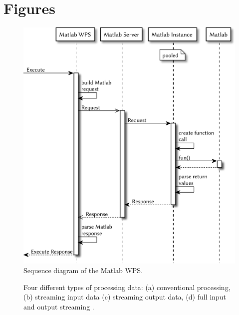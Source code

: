 \section{Figures}
	\begin{figure}[!htb]
		\centering
		\includegraphics[width=.8\textwidth]{figures/sequence-diagramm-mwps.pdf}
		\caption{\label{fig:sd:mwps} Sequence diagram of the Matlab WPS.} %
	\end{figure}
	\begin{figure}[!htb]
		\centering
		
		\caption{\label{fig:streaming}Four different types of processing data: (a) conventional processing, (b) streaming input data (c) streaming output data, (d) full input and output streaming \citep[based on][]{foerster2012live}.}
	\end{figure}

